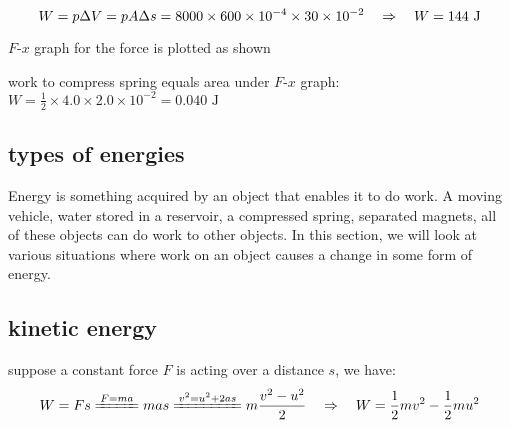 \begin{soln}
    
 \begin{equation*}
W = p \Delta V = p A \Delta s = 8000 \times 600 \times 10^{-4} \times 30 \times 10^{-2} \quad \Rightarrow \quad W = 144 \text{ J} 
\end{equation*}
\end{soln}

\begin{marginfigure}
	\vspace*{-12pt}
	\centering
	\vspace*{-16pt}
\end{marginfigure}


\begin{soln} $F$-$x$ graph for the force is plotted as shown

work to compress spring equals area under $F$-$x$ graph:
	$ W = \frac{1}{2} \times 4.0 \times 2.0 \times 10^{-2} = 0.040 \text{ J} $

 
 \end{soln}
	



\subsection{types of energies}\label{ch-KE}

Energy is something acquired by an object that enables it to do work. A moving vehicle, water stored in a reservoir, a compressed spring, separated magnets, all of these objects can do work to other objects. In this section, we will look at various situations where work on an object causes a change in some form of energy.


\subsection{kinetic energy}

suppose a constant force $F$ is acting over a distance $s$, we have:
\begin{equation*}
	W=Fs \xlongequal{F=ma} mas \xlongequal{v^2 = u^2 + 2as} m \frac{v^2-u^2}{2} \RA W = \frac{1}{2}mv^2 - \frac{1}{2}mu^2
\end{equation*}

